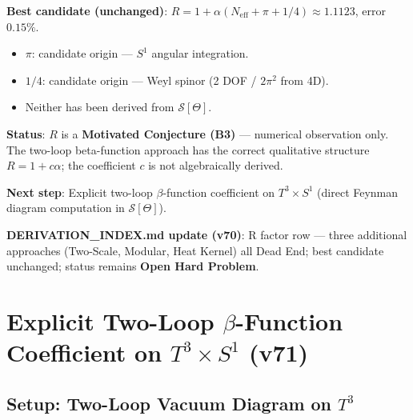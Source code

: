 \documentclass[11pt,a4paper]{article}
\theoremstyle{remark}
\begin{document}
\medskip
\textbf{Best candidate (unchanged)}: $R = 1 + \alpha(N_{\mathrm{eff}} + \pi + 1/4)
\approx 1.1123$, error $0.15\%$.
\begin{itemize}
  \item $\pi$: candidate origin — $S^1$ angular integration.
  \item $1/4$: candidate origin — Weyl spinor (2 DOF / $2\pi^2$ from 4D).
  \item Neither has been derived from $\mathcal{S}[\Theta]$.
\end{itemize}

\textbf{Status}: $R$ is a \textbf{Motivated Conjecture (B3)} — numerical
observation only.  The two-loop beta-function approach has the correct
qualitative structure $R = 1 + c\alpha$; the coefficient $c$ is not
algebraically derived.

\textbf{Next step}: Explicit two-loop $\beta$-function coefficient on
$T^3 \times S^1$ (direct Feynman diagram computation in $\mathcal{S}[\Theta]$).

\medskip
\textbf{DERIVATION\_INDEX.md update (v70)}: R factor row — three additional
approaches (Two-Scale, Modular, Heat Kernel) all Dead End; best candidate
unchanged; status remains \textbf{Open Hard Problem}.

\section{Explicit Two-Loop $\beta$-Function Coefficient on $T^3 \times S^1$ (v71)}
\label{sec:twoloop_explicit}


\subsection{Setup: Two-Loop Vacuum Diagram on $T^3$}
\end{document}

